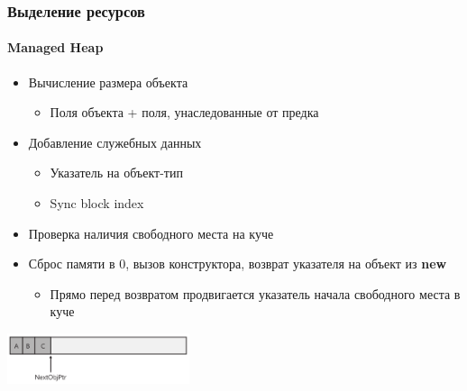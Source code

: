 \documentclass{../../slides-style}
\begin{document}
    \begin{frame}
        \frametitle{Выделение ресурсов}
        \framesubtitle{Managed Heap}
        \begin{itemize}
            \item Вычисление размера объекта
            \begin{itemize}
                \item Поля объекта + поля, унаследованные от предка
            \end{itemize}
            \item Добавление служебных данных
            \begin{itemize}
                \item Указатель на объект-тип
                \item Sync block index
            \end{itemize}
            \item Проверка наличия свободного места на куче
            \item Сброс памяти в 0, вызов конструктора, возврат указателя на объект из \textbf{new}
            \begin{itemize}
                \item Прямо перед возвратом продвигается указатель начала свободного места в куче
            \end{itemize}
        \end{itemize}
        \begin{center}
            \includegraphics[width=0.4\textwidth]{heapAllocation.png}
        \end{center}
    \end{frame}
\end{document}
